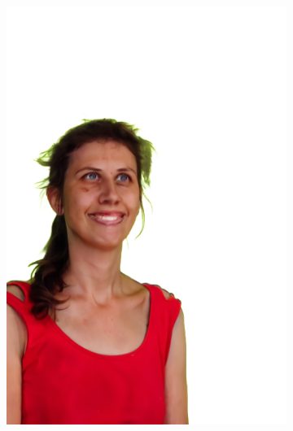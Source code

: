 \begin{figure}[ht]
\begin{subfigure}{0.08\linewidth}
        \includegraphics[width=\textwidth]{Figures/results/low/dora_smile/11_render.png}

\end{subfigure}
\end{figure}
